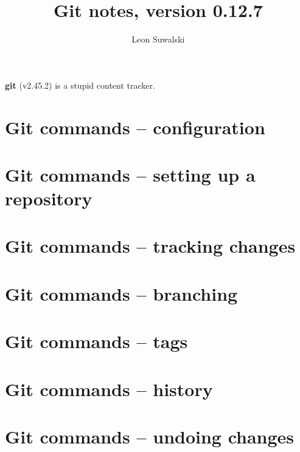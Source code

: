 \documentclass{charuun}
\title{Git notes, version 0.12.7}
\author{Leon Suwalski}
\begin{document}
\maketitle
\raggedright

\textbf{git} (v2.45.2) is a stupid content tracker.

\section{Git commands -- configuration}


\section{Git commands -- setting up a repository}



\section{Git commands -- tracking changes}






\section{Git commands -- branching}







\section{Git commands -- tags}


\section{Git commands -- history}







\section{Git commands -- undoing changes}




\end{document}
